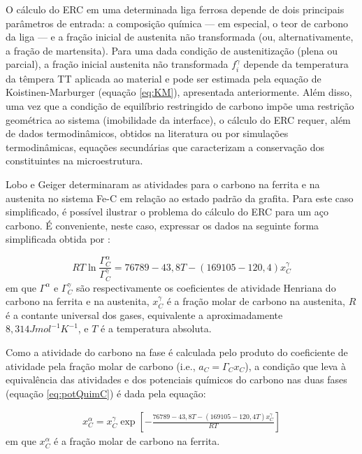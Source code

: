 \label{subsubsec:ERC}

O cálculo do ERC em uma determinada liga ferrosa depende de dois principais parâmetros de entrada: a composição química --- em especial, o teor de carbono da liga --- e a fração inicial de austenita não transformada (ou, alternativamente, a fração de martensita)\cite{Speer2003}. Para uma dada condição de austenitização (plena ou parcial), a fração inicial austenita não transformada $f_i^\gamma$ depende da temperatura da têmpera TT aplicada ao material e pode ser estimada pela equação de Koistinen-Marburger (equação \ref{eq:KM}), apresentada anteriormente. Além disso, uma vez que a condição de equilíbrio restringido de carbono impõe uma restrição geométrica ao sistema (imobilidade da interface), o cálculo do ERC requer, além de dados termodinâmicos, obtidos na literatura ou por simulações termodinâmicas, equações secundárias que caracterizam a conservação dos constituintes na microestrutura.

Lobo e Geiger\cite{Lobo1976a,Lobo1976} determinaram as atividades para o carbono na ferrita e na austenita no sistema Fe-C em relação ao estado padrão da grafita.
Para este caso simplificado, é possível ilustrar o problema do cálculo do ERC para um aço carbono. É conveniente, neste caso, expressar os dados na seguinte forma simplificada obtida por :

\begin{equation}
	RT \ln\frac{\Gamma_C^\alpha}{\Gamma_C^\gamma} = 76789 - 43,8T - (169105 - 120,4) x_C^\gamma
	\label{eq:ativC}
\end{equation}
%
em que $\Gamma^\alpha$ e $\Gamma_C^\gamma$ são respectivamente os coeficientes de atividade Henriana do carbono na ferrita e na austenita, $x_C^\gamma$ é a fração molar de carbono na austenita, $R$ é a contante universal dos gases, equivalente a aproximadamente $8,314 J mol^{-1} K^{-1}$, e $T$ é a temperatura absoluta.

Como a atividade do carbono na fase é calculada pelo produto do coeficiente de atividade pela fração molar de carbono (i.e., $a_C = \Gamma_C x_C$), a condição que leva à equivalência das atividades e dos potenciais químicos do carbono nas duas fases (equação \ref{eq:potQuimC}) é dada pela equação:

\begin{subequations}
	\begin{align}
		x_C^\alpha = x_C^\gamma \exp \left [ - \frac{76789 - 43,8T - (169105 - 120,4T) x_C^\gamma}{RT} \right ]\label{eq:ativC2}
	\end{align}
\end{subequations}
%
em que $x_C^\alpha$ é a fração molar de carbono na ferrita.

